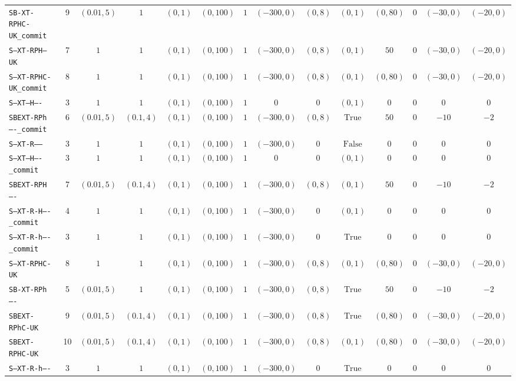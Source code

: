 {\begin{tabular}{lccccccccccccc}
\texttt{SB-XT-RPHC-UK_commit} & 9 & $(0.01,5)$ & $1$ & $(0,1)$ & $(0,100)$ & $1$ & $(-300,0)$ & $(0,8)$ & $(0,1)$ & $(0,80)$ & $0$ & $(-30,0)$ & $(-20,0)$ \\
\texttt{S--XT-RPH--UK} & 7 & $1$ & $1$ & $(0,1)$ & $(0,100)$ & $1$ & $(-300,0)$ & $(0,8)$ & $(0,1)$ & $50$ & $0$ & $(-30,0)$ & $(-20,0)$ \\
\texttt{S--XT-RPHC-UK_commit} & 8 & $1$ & $1$ & $(0,1)$ & $(0,100)$ & $1$ & $(-300,0)$ & $(0,8)$ & $(0,1)$ & $(0,80)$ & $0$ & $(-30,0)$ & $(-20,0)$ \\
\texttt{S--XT---H----} & 3 & $1$ & $1$ & $(0,1)$ & $(0,100)$ & $1$ & $0$ & $0$ & $(0,1)$ & $0$ & $0$ & $0$ & $0$ \\
\texttt{SBEXT-RPh----_commit} & 6 & $(0.01,5)$ & $(0.1,4)$ & $(0,1)$ & $(0,100)$ & $1$ & $(-300,0)$ & $(0,8)$ & $\mathrm{True}$ & $50$ & $0$ & $-10$ & $-2$ \\
\texttt{S--XT-R------} & 3 & $1$ & $1$ & $(0,1)$ & $(0,100)$ & $1$ & $(-300,0)$ & $0$ & $\mathrm{False}$ & $0$ & $0$ & $0$ & $0$ \\
\texttt{S--XT---H----_commit} & 3 & $1$ & $1$ & $(0,1)$ & $(0,100)$ & $1$ & $0$ & $0$ & $(0,1)$ & $0$ & $0$ & $0$ & $0$ \\
\texttt{SBEXT-RPH----} & 7 & $(0.01,5)$ & $(0.1,4)$ & $(0,1)$ & $(0,100)$ & $1$ & $(-300,0)$ & $(0,8)$ & $(0,1)$ & $50$ & $0$ & $-10$ & $-2$ \\
\texttt{S--XT-R-H----_commit} & 4 & $1$ & $1$ & $(0,1)$ & $(0,100)$ & $1$ & $(-300,0)$ & $0$ & $(0,1)$ & $0$ & $0$ & $0$ & $0$ \\
\texttt{S--XT-R-h----_commit} & 3 & $1$ & $1$ & $(0,1)$ & $(0,100)$ & $1$ & $(-300,0)$ & $0$ & $\mathrm{True}$ & $0$ & $0$ & $0$ & $0$ \\
\texttt{S--XT-RPHC-UK} & 8 & $1$ & $1$ & $(0,1)$ & $(0,100)$ & $1$ & $(-300,0)$ & $(0,8)$ & $(0,1)$ & $(0,80)$ & $0$ & $(-30,0)$ & $(-20,0)$ \\
\texttt{SB-XT-RPh----} & 5 & $(0.01,5)$ & $1$ & $(0,1)$ & $(0,100)$ & $1$ & $(-300,0)$ & $(0,8)$ & $\mathrm{True}$ & $50$ & $0$ & $-10$ & $-2$ \\
\texttt{SBEXT-RPhC-UK} & 9 & $(0.01,5)$ & $(0.1,4)$ & $(0,1)$ & $(0,100)$ & $1$ & $(-300,0)$ & $(0,8)$ & $\mathrm{True}$ & $(0,80)$ & $0$ & $(-30,0)$ & $(-20,0)$ \\
\texttt{SBEXT-RPHC-UK} & 10 & $(0.01,5)$ & $(0.1,4)$ & $(0,1)$ & $(0,100)$ & $1$ & $(-300,0)$ & $(0,8)$ & $(0,1)$ & $(0,80)$ & $0$ & $(-30,0)$ & $(-20,0)$ \\
\texttt{S--XT-R-h----} & 3 & $1$ & $1$ & $(0,1)$ & $(0,100)$ & $1$ & $(-300,0)$ & $0$ & $\mathrm{True}$ & $0$ & $0$ & $0$ & $0$ \\

\end{tabular}}
